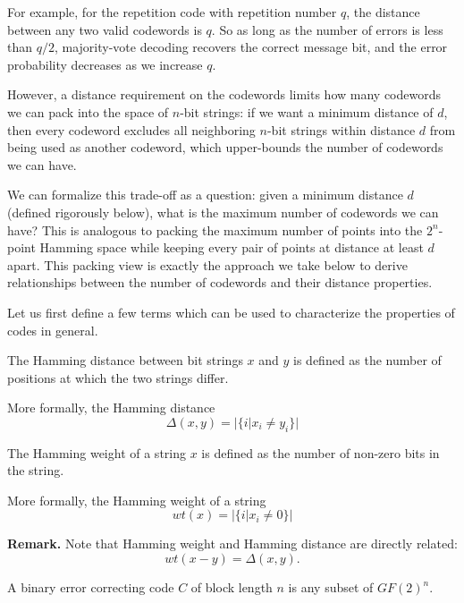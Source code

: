 For example, for the repetition code with repetition number \(q\), the distance between any two valid codewords is \(q\). So as long as the number of errors is less than \(q/2\), majority-vote decoding recovers the correct message bit, and the error probability decreases as we increase \(q\).

However, a distance requirement on the codewords limits how many codewords we can pack into the space of \(n\)-bit strings: if we want a minimum distance of \(d\), then every codeword excludes all neighboring \(n\)-bit strings within distance \(d\) from being used as another codeword, which upper-bounds the number of codewords we can have.

We can formalize this trade-off as a question: given a minimum distance \(d\) (defined rigorously below), what is the maximum number of codewords we can have? This is analogous to packing the maximum number of points into the \(2^n\)-point Hamming space while keeping every pair of points at distance at least \(d\) apart. This packing view is exactly the approach we take below to derive relationships between the number of codewords and their distance properties.


Let us first define a few terms which can be used to characterize the properties of codes in general.

\begin{definition}
     The Hamming distance between bit strings \(x\) and \(y\) is defined as the number of positions at which the two strings differ. 

More formally, the Hamming distance \[\Delta(x, y) = |\{i|x_i \neq y_i\}| \]
\end{definition}


\begin{definition}
The Hamming weight of a string \(x\) is defined as the number of non-zero bits in the string.

More formally, the Hamming weight of a string 
\[wt(x) = |\{i|x_i  \neq 0\}|\]
\end{definition} 


\textbf{Remark.} Note that Hamming weight and Hamming distance are directly related: 
\[wt(x-y) = \Delta (x, y).\]


\begin{definition}
A binary error correcting code \(C\) of block length \(n\) is any subset
of \(GF(2)^n\).
    
\end{definition}

